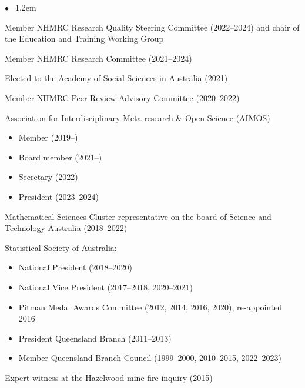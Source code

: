 \documentclass[a4paper,11pt]{article}
\renewcommand{\labelitemi}{$\bullet$}
\renewcommand{\labelitemii}{$\star$}
\begin{document}
\begin{raggedright}
\begin{list}{\labelitemi}{\leftmargin=1.2em}\addtolength{\itemsep}{-0.4\baselineskip}
\item Member NHMRC Research Quality Steering Committee (2022--2024) and chair of the Education and Training Working Group 
\item Member NHMRC Research Committee (2021--2024)
\item Elected to the Academy of Social Sciences in Australia (2021)
\item Member NHMRC Peer Review Advisory Committee (2020--2022)
\item Association for Interdisciplinary Meta-research \& Open Science (AIMOS)
\begin{itemize}
\item Member (2019--)
\item Board member (2021--)
\item Secretary (2022)
\item President (2023--2024)
\end{itemize}
\item Mathematical Sciences Cluster representative on the board of Science and Technology Australia (2018--2022)
\item Statistical Society of Australia:
\begin{itemize}
\item National President (2018--2020)
\item National Vice President (2017--2018, 2020--2021)
\item Pitman Medal Awards Committee (2012, 2014, 2016, 2020), re-appointed 2016
\item President Queensland Branch (2011--2013)
\item Member Queensland Branch Council (1999--2000, 2010--2015, 2022--2023)
\end{itemize}
\item Expert witness at the Hazelwood mine fire inquiry (2015)

\end{list}
\end{raggedright}
\end{document}
